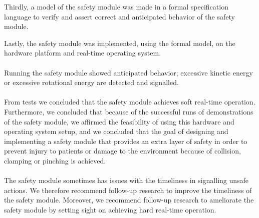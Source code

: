 \documentclass[12pt]{scrreprt}
\begin{document}
\par
Thirdly, a model of the safety module was made in a formal specification language to verify and assert correct and anticipated behavior of the safety module.
\par
Lastly, the safety module was implemented, using the formal model, on the hardware platform and real-time operating system.
\\\\
Running the safety module showed anticipated behavior; excessive kinetic energy or excessive rotational energy are detected and signalled.
\\\\
From tests we concluded that the safety module achieves soft real-time operation. Furthermore, we concluded that because of the successful runs of demonstrations of the safety module, we affirmed the feasibility of using this hardware and operating system setup, and we concluded that  the goal of designing and implementing a safety module that provides an extra layer of safety in order to prevent injury to patients or damage to the environment because of collision, clamping or pinching is achieved.
\\\\
The safety module sometimes has issues with the timeliness in signalling unsafe actions. We therefore recommend follow-up research to improve the timeliness of the safety module. Moreover, we recommend follow-up research to ameliorate the safety module by setting sight on achieving hard real-time operation.
\end{document}
